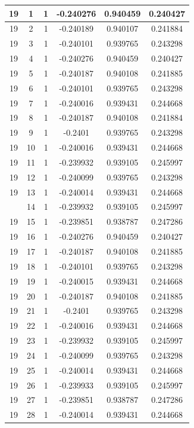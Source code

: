 \documentclass[12pt,a4paper]{article}
\numberwithin{equation}{section}
\numberwithin{figure}{section}
\numberwithin{table}{section}
\begin{document}
\begin{longtable}{|c|c|c|c|c|c|}
19 & 1 & 1 & -0.240276 & 0.940459 & 0.240427 \\ \hline
19 & 2 & 1 & -0.240189 & 0.940107 & 0.241884 \\ \hline
19 & 3 & 1 & -0.240101 & 0.939765 & 0.243298 \\ \hline
19 & 4 & 1 & -0.240276 & 0.940459 & 0.240427 \\ \hline
19 & 5 & 1 & -0.240187 & 0.940108 & 0.241885 \\ \hline
19 & 6 & 1 & -0.240101 & 0.939765 & 0.243298 \\ \hline
19 & 7 & 1 & -0.240016 & 0.939431 & 0.244668 \\ \hline
19 & 8 & 1 & -0.240187 & 0.940108 & 0.241884 \\ \hline
19 & 9 & 1 & -0.2401 & 0.939765 & 0.243298 \\ \hline
19 & 10 & 1 & -0.240016 & 0.939431 & 0.244668 \\ \hline
19 & 11 & 1 & -0.239932 & 0.939105 & 0.245997 \\ \hline
19 & 12 & 1 & -0.240099 & 0.939765 & 0.243298 \\ \hline
19 & 13 & 1 & -0.240014 & 0.939431 & 0.244668 \\ \hline
\pagebreak
19 & 14 & 1 & -0.239932 & 0.939105 & 0.245997 \\ \hline
19 & 15 & 1 & -0.239851 & 0.938787 & 0.247286 \\ \hline
19 & 16 & 1 & -0.240276 & 0.940459 & 0.240427 \\ \hline
19 & 17 & 1 & -0.240187 & 0.940108 & 0.241885 \\ \hline
19 & 18 & 1 & -0.240101 & 0.939765 & 0.243298 \\ \hline
19 & 19 & 1 & -0.240015 & 0.939431 & 0.244668 \\ \hline
19 & 20 & 1 & -0.240187 & 0.940108 & 0.241885 \\ \hline
19 & 21 & 1 & -0.2401 & 0.939765 & 0.243298 \\ \hline
19 & 22 & 1 & -0.240016 & 0.939431 & 0.244668 \\ \hline
19 & 23 & 1 & -0.239932 & 0.939105 & 0.245997 \\ \hline
19 & 24 & 1 & -0.240099 & 0.939765 & 0.243298 \\ \hline
19 & 25 & 1 & -0.240014 & 0.939431 & 0.244668 \\ \hline
19 & 26 & 1 & -0.239933 & 0.939105 & 0.245997 \\ \hline
19 & 27 & 1 & -0.239851 & 0.938787 & 0.247286 \\ \hline
19 & 28 & 1 & -0.240014 & 0.939431 & 0.244668 \\ \hline

\end{longtable}
\end{document}
